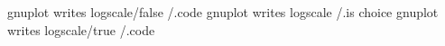 gnuplot writes logscale/false      /.code
gnuplot writes logscale            /.is choice
gnuplot writes logscale/true       /.code

